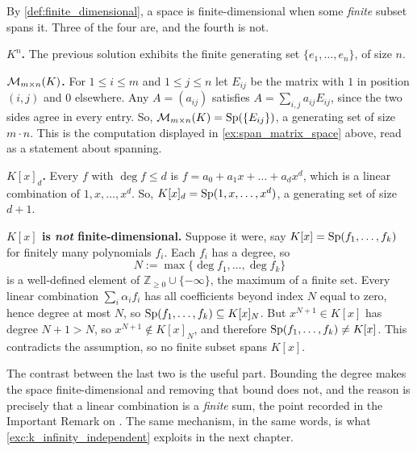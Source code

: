 \begin{exercisesolution}
\label{sol:finite_dimensional_examples}
By \cref{def:finite_dimensional}, a space is finite-di\-men\-sional when some \emph{finite} subset spans it. Three of the four are, and the fourth is not.

\textbf{$K^n$.} The previous solution exhibits the finite generating set $\{e_1, \dots, e_n\}$, of size $n$.

\textbf{$\mathcal{M}_{m \times n}(K)$.} For $1 \le i \le m$ and $1 \le j \le n$ let $E_{ij}$ be the matrix with $1$ in position $(i,j)$ and $0$ elsewhere. Any $A = (a_{ij})$ satisfies $A = \sum_{i,j} a_{ij} E_{ij}$, since the two sides agree in every entry. So, $\mathcal{M}_{m \times n}(K) = \operatorname{Sp}(\{E_{ij}\})$, a generating set of size $m \cdot n$. This is the computation displayed in \cref{ex:span_matrix_space} above, read as a statement about spanning.

\textbf{$K[x]_d$.} Every $f$ with $\deg f \le d$ is $f = a_0 + a_1 x + \dots + a_d x^d$, which is a linear combination of $1, x, \dots, x^d$. So, $K[x]_d = \operatorname{Sp}(1, x, \dots, x^d)$, a generating set of size $d+1$.

\textbf{$K[x]$ is \emph{not} finite-di\-men\-sional.} Suppose it were, say $K[x] = \operatorname{Sp}(f_1, \dots, f_k)$ for finitely many polynomials $f_i$. Each $f_i$ has a degree, so
\[
    N := \max \{ \deg f_1, \dots, \deg f_k \}
\]
is a well-defined element of $\mathbb{Z}_{\ge 0} \cup \{-\infty\}$, the maximum of a finite set. Every linear combination $\sum_i \alpha_i f_i$ has all coefficients beyond index $N$ equal to zero, hence degree at most $N$, so $\operatorname{Sp}(f_1, \dots, f_k) \subseteq K[x]_N$. But $x^{N+1} \in K[x]$ has degree $N+1 > N$, so $x^{N+1} \notin K[x]_N$, and therefore $\operatorname{Sp}(f_1, \dots, f_k) \ne K[x]$. This contradicts the assumption, so no finite subset spans $K[x]$.

The contrast between the last two is the useful part. Bounding the degree makes the space finite-di\-men\-sional and removing that bound does not, and the reason is precisely that a linear combination is a \emph{finite} sum, the point recorded in the Important Remark on . The same mechanism, in the same words, is what \cref{exc:k_infinity_independent} exploits in the next chapter.
\end{exercisesolution}




